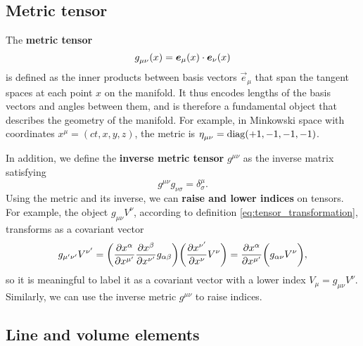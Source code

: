 \subsection{Metric tensor}

The \textbf{metric tensor}
\begin{equation}
	g\indices{_\mu_\nu}(x) = \vec{e}_\mu(x) \cdot \vec{e}_\nu(x)
\label{eq:def_metric}
\end{equation}
is defined as the inner products between basis vectors $\vec{e}_\mu$ that span the tangent spaces at each point $x$ on the manifold.
It thus encodes lengths of the basis vectors and angles between them, and is therefore a fundamental object that describes the geometry of the manifold.
For example, in Minkowski space with coordinates $x^\mu = (ct, x, y, z)$, the metric is $\eta\indices{_\mu_\nu} = \diag (+1, -1, -1, -1)$.

In addition, we define the \textbf{inverse metric tensor} $g^{\mu \nu}$ as the inverse matrix satisfying
\begin{equation}
	g^{\mu \nu} g_{\nu \sigma} = \delta^\mu_\sigma .
\end{equation}
Using the metric and its inverse, we can \textbf{raise and lower indices} on tensors.
For example, the object $g_{\mu \nu} V^\nu$, according to definition \eqref{eq:tensor_transformation}, transforms as a covariant vector
\begin{equation}
	g_{\mu' \nu'} V^{\nu'} = \bigg( \pdv{x^{\alpha}}{x^{\mu'}} \pdv{x^{\beta}}{x^{\nu'}} g_{\alpha \beta} \bigg) \bigg( \pdv{x^{\nu'}}{x^{\nu}} V^{\nu} \bigg) = \pdv{x^{\alpha}}{x^{\mu'}} \bigg( g_{\alpha \nu} V^\nu \bigg) ,
\end{equation}
so it is meaningful to label it as a covariant vector with a lower index $V_\mu = g_{\mu \nu} V^\nu$.
Similarly, we can use the inverse metric $g^{\mu \nu}$ to raise indices.

\subsection{Line and volume elements}

